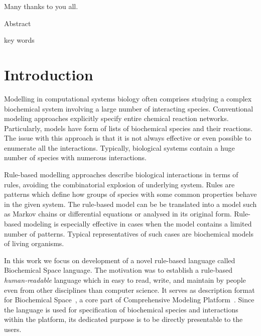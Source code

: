\documentclass[12pt]{fithesis2}
\begin{document}
\FrontMatter
\ThesisTitlePage

\begin{ThesisDeclaration}
\DeclarationText
\AdvisorName
\end{ThesisDeclaration}

\begin{ThesisThanks}
Many thanks to you all.
\end{ThesisThanks}

\begin{ThesisAbstract}
Abstract
\end{ThesisAbstract}

\begin{ThesisKeyWords}
key words
\end{ThesisKeyWords}

\MainMatter
\tableofcontents

\chapter{Introduction}

Modelling in computational systems biology often comprises studying a complex biochemical system involving a large number of interacting species. Conventional modeling approaches explicitly specify entire chemical reaction networks. Particularly, models have form of lists of biochemical species and their reactions. The issue with this approach is that it is not always effective or even possible to enumerate all the interactions. Typically, biological systems contain a huge number of species with numerous interactions.

Rule-based modelling approaches describe biological interactions in terms of rules, avoiding the combinatorial explosion of underlying system. Rules are patterns which define how groups of species with some common properties behave in the given system. The rule-based model can be be translated into a model such as Markov chains or differential equations or analysed in its original form. Rule-based modeling is especially effective in cases when the model contains a limited number of patterns. Typical representatives of such cases are biochemical models of living organisms.

In this work we focus on development of a novel rule-based language called Biochemical Space language. The motivation was to establish a rule-based \emph{human-readable} language which in easy to read, write, and maintain by people even from other disciplines than computer science. It serves as description format for Biochemical Space~\cite{BCS}, a core part of Comprehensive Modeling Platform~\cite{cs2bio2013}. Since the language is used for specification of biochemical species and interactions within the platform, its dedicated purpose is to be directly presentable to the users.
\end{document}
